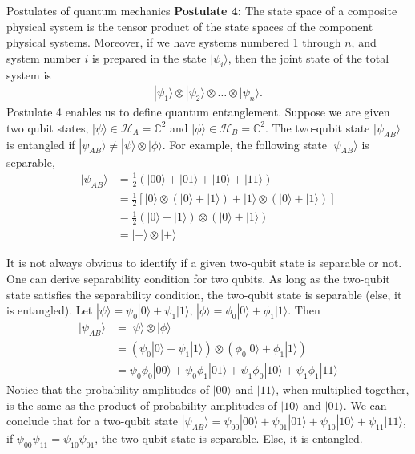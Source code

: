 \documentclass{beamer}
\begin{document}
\begin{frame}{Postulates of quantum mechanics}
\justify
\textbf{Postulate 4:} The state space of a composite physical system is the tensor product of the state spaces of the component physical systems. Moreover, if we have systems numbered 1 through $n$, and system number $i$ is prepared in the state $|\psi_i\rangle$, then the joint state of the total system is
\begin{align}
|\psi_1\rangle \otimes |\psi_2\rangle \otimes \ldots \otimes |\psi_n\rangle.
\end{align}
\vfill
Postulate 4 enables us to define quantum entanglement. Suppose we are given two qubit states, $|\psi\rangle \in \mathcal{H}_A = \mathbb{C}^2$ and $|\phi\rangle \in \mathcal{H}_B = \mathbb{C}^2$. The two-qubit state $|\psi_{AB}\rangle$ is entangled if $|\psi_{AB}\rangle \neq |\psi\rangle \otimes |\phi\rangle$.
\vfill
For example, the following state $|\psi_{AB}\rangle$ is separable,
\begin{align*}
|\psi_{AB}\rangle & = \frac{1}{2} (|00\rangle + |01\rangle + |10\rangle + |11\rangle) \\
& = \frac{1}{2} [|0\rangle \otimes (|0\rangle + |1\rangle) + |1\rangle \otimes (|0\rangle + |1\rangle)] \\
& = \frac{1}{2} (|0\rangle + |1\rangle) \otimes (|0\rangle + |1\rangle) \\
& = |+\rangle \otimes |+\rangle
\end{align*}
\end{frame}

\begin{frame}
\justify
It is not always obvious to identify if a given two-qubit state is separable or not. One can derive separability condition for two qubits. As long as the two-qubit state satisfies the separability condition, the two-qubit state is separable (else, it is entangled).
\vfill
Let $|\psi\rangle = \psi_0 |0\rangle + \psi_1 |1\rangle$, $|\phi\rangle = \phi_0 |0\rangle + \phi_1 |1\rangle$. Then
\begin{align*}
|\psi_{AB}\rangle & = |\psi\rangle \otimes |\phi\rangle \\
& = (\psi_0 |0\rangle + \psi_1 |1\rangle) \otimes (\phi_0 |0\rangle + \phi_1 |1\rangle) \\
& = \psi_0\phi_0 |00\rangle + \psi_0\phi_1 |01\rangle + \psi_1\phi_0 |10\rangle + \psi_1\phi_1 |11\rangle
\end{align*}
\vfill
Notice that the probability amplitudes of $|00\rangle$ and $|11\rangle$, when multiplied together, is the same as the product of probability amplitudes of $|10\rangle$ and $|01\rangle$. We can conclude that for a two-qubit state $|\psi_{AB}\rangle = \psi_{00}|00\rangle + \psi_{01}|01\rangle + \psi_{10}|10\rangle + \psi_{11}|11\rangle$, if $\psi_{00} \psi_{11} = \psi_{10} \psi_{01}$, the two-qubit state is separable. Else, it is entangled.
\end{frame}
\end{document}
